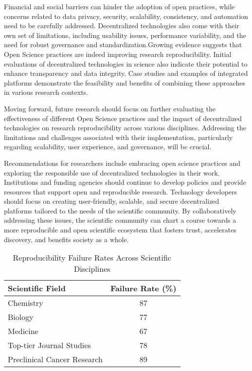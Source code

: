 \documentclass{article}
\begin{document}
Financial and social barriers can hinder the adoption of open practices, while concerns related to data privacy, security, scalability, consistency, and automation need to be carefully addressed. Decentralized technologies also come with their own set of limitations, including usability issues, performance variability, and the need for robust governance and standardization.Growing evidence suggests that Open Science practices are indeed improving research reproducibility. Initial evaluations of decentralized technologies in science also indicate their potential to enhance transparency and data integrity. Case studies and examples of integrated platforms demonstrate the feasibility and benefits of combining these approaches in various research contexts.

Moving forward, future research should focus on further evaluating the effectiveness of different Open Science practices and the impact of decentralized technologies on research reproducibility across various disciplines. Addressing the limitations and challenges associated with their implementation, particularly regarding scalability, user experience, and governance, will be crucial.

Recommendations for researchers include embracing open science practices and exploring the responsible use of decentralized technologies in their work. Institutions and funding agencies should continue to develop policies and provide resources that support open and reproducible research. Technology developers should focus on creating user-friendly, scalable, and secure decentralized platforms tailored to the needs of the scientific community. By collaboratively addressing these issues, the scientific community can chart a course towards a more reproducible and open scientific ecosystem that fosters trust, accelerates discovery, and benefits society as a whole.





\begin{table}[h]
    \centering
    \caption{Reproducibility Failure Rates Across Scientific Disciplines}
    \begin{tabular}{|l|c|}
        \hline
        \textbf{Scientific Field}   & \textbf{Failure Rate (\%)} \\
        \hline
        Chemistry                   & 87                         \\
        Biology                     & 77                         \\
        Medicine                    & 67                         \\
        Top-tier Journal Studies    & 78                         \\
        Preclinical Cancer Research & 89                         \\
        \hline
    \end{tabular}
    \label{tab:reproducibility}
\end{table}
\end{document}
